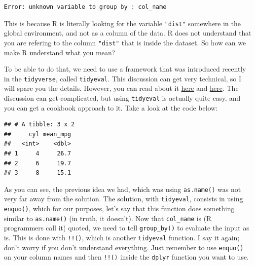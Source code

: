 \documentclass[]{gitbook}
\newenvironment{Shaded}{\begin{snugshade}}{\end{snugshade}}
\newcommand{\ControlFlowTok}[1]{\textcolor[rgb]{0.13,0.29,0.53}{\textbf{#1}}}
\newcommand{\DataTypeTok}[1]{\textcolor[rgb]{0.13,0.29,0.53}{#1}}
\newcommand{\KeywordTok}[1]{\textcolor[rgb]{0.13,0.29,0.53}{\textbf{#1}}}
\newcommand{\NormalTok}[1]{#1}
\newcommand{\OperatorTok}[1]{\textcolor[rgb]{0.81,0.36,0.00}{\textbf{#1}}}
\newcommand{\StringTok}[1]{\textcolor[rgb]{0.31,0.60,0.02}{#1}}
\theoremstyle{definition}
\theoremstyle{definition}
\theoremstyle{definition}
\theoremstyle{remark}
\begin{document}
\begin{verbatim}
Error: unknown variable to group by : col_name
\end{verbatim}

This is because R is literally looking for the variable \texttt{"dist"}
somewhere in the global environment, and not as a column of the data. R
does not understand that you are refering to the column \texttt{"dist"}
that is inside the dataset. So how can we make R understand what you
mean?

To be able to do that, we need to use a framework that was introduced
recently in the \texttt{tidyverse}, called \texttt{tidyeval}. This
discussion can get very technical, so I will spare you the details.
However, you can read about it
\href{http://dplyr.tidyverse.org/articles/programming.html}{here} and
\href{https://cran.r-project.org/web/packages/rlang/vignettes/tidy-evaluation.html}{here}.
The discussion can get complicated, but using \texttt{tidyeval} is
actually quite easy, and you can get a cookbook approach to it. Take a
look at the code below:

\begin{Shaded}
\end{Shaded}

\begin{verbatim}
## # A tibble: 3 x 2
##     cyl mean_mpg
##   <int>    <dbl>
## 1     4     26.7
## 2     6     19.7
## 3     8     15.1
\end{verbatim}

As you can see, the previous idea we had, which was using
\texttt{as.name()} was not very far away from the solution. The
solution, with \texttt{tidyeval}, consists in using \texttt{enquo()},
which for our purposes, let's say that this function does something
similar to \texttt{as.name()} (in truth, it doesn't). Now that
\texttt{col\_name} is (R programmers call it) quoted, we need to tell
\texttt{group\_by()} to evaluate the input as is. This is done with
\texttt{!!()}, which is another \texttt{tidyeval} function. I say it
again; don't worry if you don't understand everything. Just remember to
use \texttt{enquo()} on your column names and then \texttt{!!()} inside
the \texttt{dplyr} function you want to use.
\end{document}
